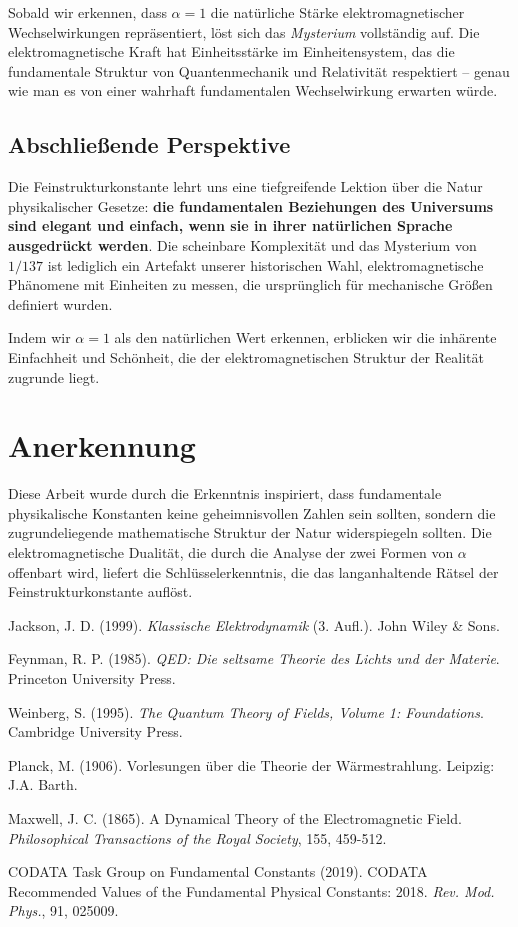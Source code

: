 \documentclass[12pt,a4paper]{article}
\begin{document}
	Sobald wir erkennen, dass $\alpha = 1$ die natürliche Stärke elektromagnetischer Wechselwirkungen repräsentiert, löst sich das \textit{Mysterium} vollständig auf. Die elektromagnetische Kraft hat Einheitsstärke im Einheitensystem, das die fundamentale Struktur von Quantenmechanik und Relativität respektiert -- genau wie man es von einer wahrhaft fundamentalen Wechselwirkung erwarten würde.
	
	\subsection{Abschließende Perspektive}
	
	Die Feinstrukturkonstante lehrt uns eine tiefgreifende Lektion über die Natur physikalischer Gesetze: \textbf{die fundamentalen Beziehungen des Universums sind elegant und einfach, wenn sie in ihrer natürlichen Sprache ausgedrückt werden}. Die scheinbare Komplexität und das Mysterium von \textit{$1/137$} ist lediglich ein Artefakt unserer historischen Wahl, elektromagnetische Phänomene mit Einheiten zu messen, die ursprünglich für mechanische Größen definiert wurden.
	
	Indem wir $\alpha = 1$ als den natürlichen Wert erkennen, erblicken wir die inhärente Einfachheit und Schönheit, die der elektromagnetischen Struktur der Realität zugrunde liegt.
	
	\section{Anerkennung}
	
	Diese Arbeit wurde durch die Erkenntnis inspiriert, dass fundamentale physikalische Konstanten keine geheimnisvollen Zahlen sein sollten, sondern die zugrundeliegende mathematische Struktur der Natur widerspiegeln sollten. Die elektromagnetische Dualität, die durch die Analyse der zwei Formen von $\alpha$ offenbart wird, liefert die Schlüsselerkenntnis, die das langanhaltende Rätsel der Feinstrukturkonstante auflöst.
	
	\begin{thebibliography}{9}
		 Jackson, J. D. (1999). \textit{Klassische Elektrodynamik} (3. Aufl.). John Wiley \& Sons.
		
		 Feynman, R. P. (1985). \textit{QED: Die seltsame Theorie des Lichts und der Materie}. Princeton University Press.
		
		 Weinberg, S. (1995). \textit{The Quantum Theory of Fields, Volume 1: Foundations}. Cambridge University Press.
		
		 Planck, M. (1906). Vorlesungen über die Theorie der Wärmestrahlung. Leipzig: J.A. Barth.
		
		 Maxwell, J. C. (1865). A Dynamical Theory of the Electromagnetic Field. \textit{Philosophical Transactions of the Royal Society}, 155, 459-512.
		
		 CODATA Task Group on Fundamental Constants (2019). CODATA Recommended Values of the Fundamental Physical Constants: 2018. \textit{Rev. Mod. Phys.}, 91, 025009.
	\end{thebibliography}
	
\end{document}
